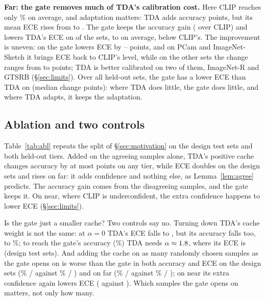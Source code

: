 \documentclass[10pt]{article}
\begin{document}
\textbf{Far: the gate removes much of TDA's calibration cost.} Here CLIP reaches only \genFarMeanClipAcc\% on average,
and adaptation matters: TDA adds \genFarTdaGainAcc{} accuracy points, but its mean ECE rises from \genFarMeanClipEce{} to
\genFarMeanTdaEce. The gate keeps the accuracy gain (\genFarGateOverClipAcc{} over CLIP) and lowers TDA's ECE on
\genFarEceWins{} of the \genFarN{} sets, to \genFarMeanGateEce{} on average, below CLIP's. The improvement is uneven: on
\farBigNames{} the gate lowers ECE by \farBigLo--\farBigHi{} points, and on PCam and ImageNet-Sketch it brings ECE back
to CLIP's level, while on the other \farRestN{} sets the change ranges from \farRestLo{} to \farRestHi{} points; TDA is
better calibrated on two of them, ImageNet-R and GTSRB (\S\ref{sec:limits}). Over all \genAllN{} held-out sets, the gate
has a lower ECE than TDA on \genAllEceWins{} (median change \genAllMedDEce{} points): where TDA does little, the gate does
little, and where TDA adapts, it keeps the adaptation.

\subsection{Ablation and two controls}\label{sec:abl}
\begin{table}[t]
\centering\small
\caption{Ablation (3 seeds, mean over datasets; exact re-evaluation of logged runs): accuracy / ECE when TDA's positive
cache is added to $b$ on different samples. The random control uses as many samples as the gate opens on (last row),
drawn uniformly. Far: the seven far sets other than ImageNet-Sketch, so its means differ from Table~\ref{tab:gen}.}
\label{tab:abl}
\resizebox{0.9\linewidth}{!}{}
\end{table}

Table~\ref{tab:abl} repeats the split of \S\ref{sec:motivation} on the design test sets and both held-out tiers. Added on
the agreeing samples alone, TDA's positive cache changes accuracy by at most \niAposMaxDAcc{} points on any tier, while
ECE doubles on the design sets and rises on far: it adds confidence and nothing else, as Lemma~\ref{lem:agree}
predicts. The accuracy gain comes from the disagreeing samples, and the gate keeps it. On near, where CLIP is
underconfident, the extra confidence happens to lower ECE (\S\ref{sec:limits}).

Is the gate just a smaller cache? Two controls say no. Turning down TDA's cache weight is not the same: at $\alpha = 0$
TDA's ECE falls to \sweepZeroEce, but its accuracy falls too, to \sweepZeroAcc\%; to reach the gate's accuracy
(\sweepGateAcc\%) TDA needs $\alpha \approx 1.8$, where its ECE is \matchedTdaEce{} (design test sets). And
adding the cache on as many randomly chosen samples as the gate opens on is worse than the gate in both accuracy and ECE
on the design sets (\ablRandAccTest\% / \ablRandEceTest{} against \ablGateAccTest\% / \ablGateEceTest) and on far
(\ablRandAccFar\% / \ablRandEceFar{} against \ablGateAccFar\% / \ablGateEceFar); on near its extra confidence again lowers
ECE (\ablRandEceNear{} against \ablGateEceNear). Which samples the gate opens on matters, not only how many.
\end{document}
